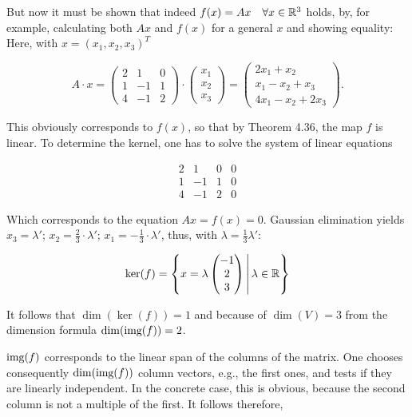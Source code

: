 But now it must be shown that indeed \(f(x) = Ax \quad \forall x \in \mathbb{R}^3\) holds, by, 
for example, calculating both \(Ax\) and \(f(x)\) for a 
general \(x\) and showing equality: Here, with \(x = {(x_1, x_2, x_3)}^T\)

\[
    A \cdot x =
    \begin{pmatrix}
    2 & 1 & 0 \\
    1 & -1 & 1 \\
    4 & -1 & 2
    \end{pmatrix}
    \cdot
    \begin{pmatrix}
    x_1 \\
    x_2 \\
    x_3
    \end{pmatrix} =
    \begin{pmatrix}
    2x_1 + x_2 \\
    x_1 - x_2 + x_3 \\
    4x_1 - x_2 + 2x_3
    \end{pmatrix} .
\]

This obviously corresponds to \(f(x)\), so that by Theorem 4.36, the map \(f\) is linear. To determine the kernel, one has to solve the system of linear equations

\[
    \begin{array}{cccc}
    2 & 1 & 0 & 0 \\
    1 & -1 & 1 & 0 \\
    4 & -1 & 2 & 0
    \end{array}
\]

Which corresponds to the equation \(Ax = f(x) = 0\). Gaussian 
elimination yields \(x_3 = \lambda'\); 
\(x_2 = \frac{2}{3} \cdot \lambda'\); \(x_1 = -\frac{1}{3} \cdot \lambda'\), 
thus, with \(\lambda = \frac{1}{3} \lambda'\):

\[
    \ker(f) =
    \left\{
    x = \lambda
    \begin{pmatrix}
    -1 \\
    2 \\
    3
    \end{pmatrix}
    \, \middle| \, \lambda \in \mathbb{R}
    \right\}
\]

It follows that \(\dim(\ker(f)) = 1\) and because of \(\dim(V) = 3\) from the dimension 
formula \(\dim(\text{img}(f)) = 2\). 

\(\text{img}(f)\) corresponds to the linear span of the columns of the matrix. One chooses consequently 
\(\dim(\text{img}(f))\) column vectors, e.g., the first ones, and tests if they are linearly independent. 
In the concrete case, this is obvious, because the second column is 
not a multiple of the first. It follows therefore,

